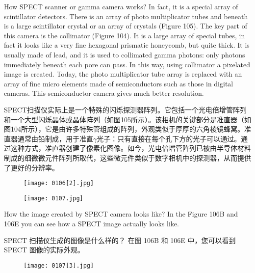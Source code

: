 \documentclass[dvipsnames, svgnames,a4paper,11pt]{article}
\begin{document}
How SPECT scanner or gamma camera works?
In fact, it is a special array of scintillator
detectors. There is an array of photo
multiplicator tubes and beneath is a large
scintillator crystal or an array of crystals
(Figure 105). The key part of this camera
is the collimator (Figure 104). It is a large
array of special tubes, in fact it looks like a
very fine hexagonal prismatic honeycomb,
but quite thick. It is usually made of lead,
and it is used to collimated gamma
photons: only photons immediately
beneath each pore can pass. In this way,
using collimator a pixelated image is
created. Today, the photo multiplicator
tube array is replaced with an array of fine
micro elements made of semiconductors
such as those in digital cameras. This semiconductor camera gives much better
resolution.


SPECT扫描仪实际上是一个特殊的闪烁探测器阵列。它包括一个光电倍增管阵列和一个大型闪烁晶体或晶体阵列（如图105所示）。该相机的关键部分是准直器（如图104所示），它是由许多特殊管组成的阵列，外观类似于厚厚的六角棱镜蜂窝。准直器通常由铅制成，用于准直$\gamma$光子：只有直接在每个孔下方的光子可以通过。通过这种方式，准直器创建了像素化图像。如今，光电倍增管阵列已被由半导体材料制成的细微微元件阵列所取代，这些微元件类似于数字相机中的探测器，从而提供了更好的分辨率。

\begin{figure}[h]
    \centering
    \texttt{[image: 0106[2].jpg]}
     \label{fig104}
\end{figure}

\begin{figure}[H]
    \centering
    \texttt{[image: 0107.jpg]}
     \label{fig105}
\end{figure}

How the image created by SPECT camera looks like? In the Figure 106B and 106E
you can see how a SPECT image actually looks like.

SPECT 扫描仪生成的图像是什么样的？ 在图 106B 和 106E 中，您可以看到 SPECT 图像的实际外观。

\begin{figure}[H]
    \centering
    \texttt{[image: 0107[3].jpg]}
     \label{fig106}
\end{figure}
\end{document}
